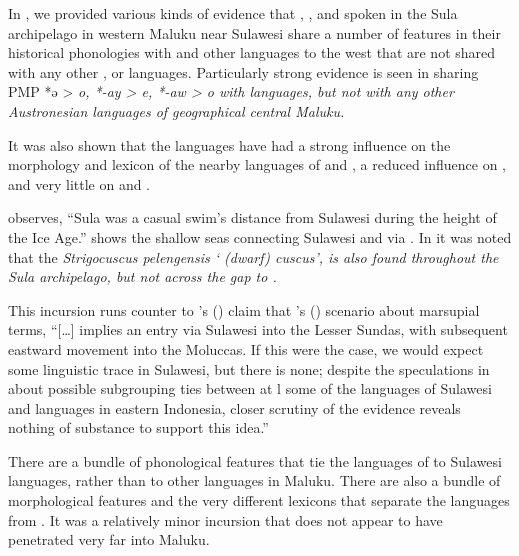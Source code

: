 In , we provided various kinds of evidence that ,
, and  spoken in the Sula archipelago in western Maluku
near Sulawesi share a number of features in their historical
phonologies with  and other  languages to the west that are not shared
with any other ,
 or  languages.
Particularly strong evidence is seen in sharing PMP *ə > \it{o},
*-ay > \it{e}, *-aw > \it{o} with  languages,
but not with any other Austronesian languages of geographical central Maluku.

It was also shown that the  languages have had a
strong influence on the morphology
and lexicon of the nearby  languages of 
and , a reduced influence on ,
and very little on  and .

\citet[130]{Bloyd2020} observes, “Sula was a casual swim’s distance
from Sulawesi during the height of the Ice Age.” 
shows the shallow seas connecting Sulawesi
and  via .
In  it was noted that the \it{Strigocuscus pelengensis}
‘ (dwarf) cuscus’, is also found throughout the Sula archipelago,
but not across the gap to .

This incursion runs counter to \citeauthor{Blust2012b}'s (\citeyear[274]{Blust2012b}) claim
that \citeauthor{Schapper2011}’s (\citeyear{Schapper2011}) scenario about marsupial terms,
“[\ldots] implies an entry via Sulawesi into the Lesser Sundas,
with subsequent eastward movement into the Moluccas.
If this were the case,
we would expect some linguistic trace in Sulawesi,
but there is none; despite the speculations in \citet{DonohueGrimes2008}
about possible subgrouping ties between at l some of the
languages of Sulawesi and languages in eastern Indonesia,
closer scrutiny of the evidence reveals nothing of substance
to support this idea.”

There are a bundle of phonological features that tie the languages
of  to Sulawesi languages, rather than to other languages in Maluku.
There are also a bundle of morphological features
and the very different lexicons that separate
the  languages from .
It was a relatively minor incursion that does not appear to have
penetrated very far into Maluku.